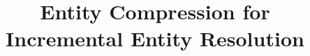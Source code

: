 \documentclass{vldb}
\title{Entity Compression for Incremental Entity Resolution}
\author{\alignauthor{Christan Earl Grant}\\
    \affaddr{University of Florida}\\
    \affaddr{Dept.\ of Computer Science}\\
    \affaddr{Gainesville, Florida, USA} \\
    \email{cgrant@cise.ufl.edu}\\
\alignauthor{Daisy Zhe Wang}\\
    \affaddr{University of Florida}\\
    \affaddr{Dept.\ of Computer Science}\\
    \affaddr{Gainesville, Florida, USA}\\
    \email{daisyw@cise.ufl.edu}\\
}
\begin{document}
\maketitle














{%
  \scriptsize%
  
  
}
\end{document}
